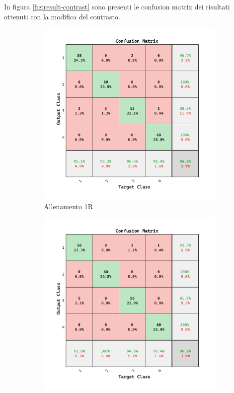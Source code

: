 In figura \cref{fig:result-contrast} sono presenti le confusion matrix dei risultati ottenuti con la modifica del contrasto.

\begin{figure}[ht]
    \centering
    \begin{subfigure}{0.45\textwidth}
        \includegraphics[width=\textwidth]{addestramento-rete-neurale/one-contrast.pdf}
        \caption{Allenamento 1R} 
    \end{subfigure}
    \begin{subfigure}{0.45\textwidth}
        \includegraphics[width=\textwidth]{addestramento-rete-neurale/two-contrast.pdf}

\end{subfigure}
\end{figure}
